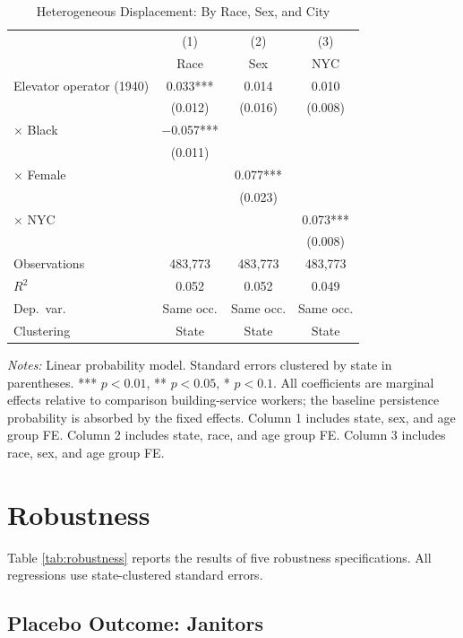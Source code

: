 \documentclass[12pt]{article}
\begin{document}
\begin{table}[H]
\centering
\caption{Heterogeneous Displacement: By Race, Sex, and City}
\label{tab:heterogeneity}
\small
\begin{tabular}{lccc}
\toprule
& (1) & (2) & (3) \\
& Race & Sex & NYC \\
\midrule
Elevator operator (1940) & 0.033*** & 0.014 & 0.010 \\
& (0.012) & (0.016) & (0.008) \\
$\times$ Black & $-$0.057*** & & \\
& (0.011) & & \\
$\times$ Female & & 0.077*** & \\
& & (0.023) & \\
$\times$ NYC & & & 0.073*** \\
& & & (0.008) \\
\addlinespace
Observations & 483,773 & 483,773 & 483,773 \\
$R^2$ & 0.052 & 0.052 & 0.049 \\
\midrule
Dep.\ var. & Same occ. & Same occ. & Same occ. \\
Clustering & State & State & State \\
\bottomrule
\end{tabular}
\begin{flushleft}
\small\textit{Notes:} Linear probability model. Standard errors clustered by state in parentheses. *** $p<0.01$, ** $p<0.05$, * $p<0.1$. All coefficients are marginal effects relative to comparison building-service workers; the baseline persistence probability is absorbed by the fixed effects. Column 1 includes state, sex, and age group FE. Column 2 includes state, race, and age group FE. Column 3 includes race, sex, and age group FE.
\end{flushleft}
\end{table}


\section{Robustness}

Table \ref{tab:robustness} reports the results of five robustness specifications. All regressions use state-clustered standard errors.

\subsection{Placebo Outcome: Janitors}
\end{document}
